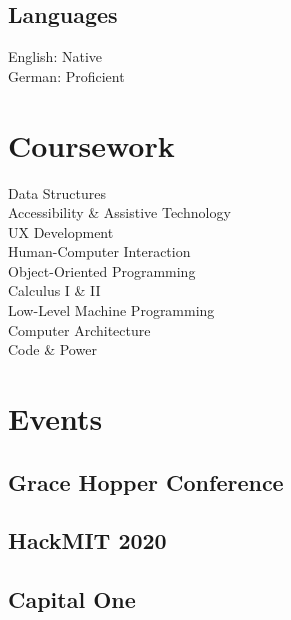 \documentclass[]{hieudo-build}
\begin{document}
\begin{minipage}[t]{0.34\textwidth}
\subsection{Languages}
English: Native \\
German: Proficient \\
\sectionsep

\section{Coursework}
Data Structures \\
Accessibility \& Assistive Technology \\
UX Development \\
Human-Computer Interaction \\
Object-Oriented Programming \\
Calculus I \& II \\
Low-Level Machine Programming \\
Computer Architecture \\
Code \& Power
\sectionsep

\section{Events}
\subsection{Grace Hopper Conference}
\smallsectionsep
\subsection{HackMIT 2020}
\smallsectionsep
\subsection{Capital One} 
\sectionsep



\end{minipage}
\end{document}
